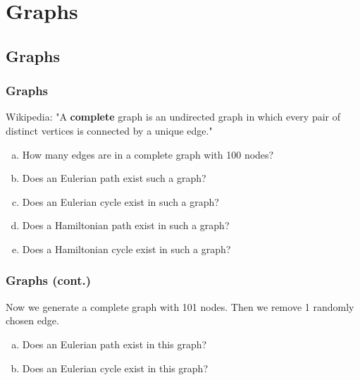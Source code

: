 \documentclass[9pt]{beamer}
\begin{document}
\section{Graphs}
\subsection{Graphs}

\begin{frame}[fragile]
  \frametitle{Graphs}
Wikipedia: "A \textbf{complete} graph is an undirected graph in which every pair of distinct vertices is connected by a unique edge."
\begin{enumerate}[(a)]
\item How many edges are in a complete graph with 100 nodes? 
\item Does an Eulerian path exist such a graph? 
\item Does an Eulerian cycle exist in such a graph? 
\item Does a Hamiltonian path exist in such a graph? 
\item Does a Hamiltonian cycle exist in such a graph? 
\end{enumerate}
\end{frame}

\begin{frame}[fragile]
  \frametitle{Graphs (cont.)}
Now we generate a complete graph with 101 nodes. Then we remove 1 randomly chosen edge.
\begin{enumerate}[(a)]
\item Does an Eulerian path exist in this graph?  
\item Does an Eulerian cycle exist in this graph?   \newline \newline
\end{enumerate}

\begin{enumerate}
\end{enumerate}
\end{frame}
\end{document}
